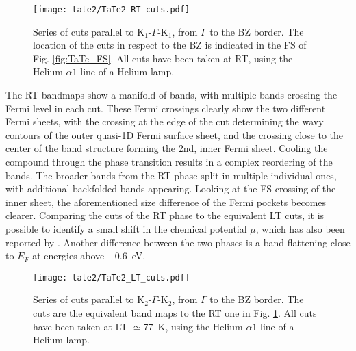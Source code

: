 \begin{figure}[t!]
	\centering
	\texttt{[image: tate2/TaTe2\_RT\_cuts.pdf]}
	\caption{Series of cuts parallel to K$_1$-$\Gamma$-K$_1$, from $\Gamma$ to the BZ border. The location of the cuts in respect to the BZ is indicated in the FS of Fig. \ref{fig:TaTe_FS}. All cuts have been taken at RT, using the Helium $\alpha1$ line of a Helium lamp.}
	\label{fig:TaTe_RT_cuts}
\end{figure}

The RT bandmaps show a manifold of bands, with multiple bands crossing the Fermi level in each cut.
These Fermi crossings clearly show the two different Fermi sheets, with the crossing at the edge of the cut determining the wavy contours of the outer quasi-1D Fermi surface sheet, and the crossing close to the center of the band structure forming the 2nd, inner Fermi sheet.
Cooling the compound through the phase transition results in a complex reordering of the bands.
The broader bands from the RT phase split in multiple individual ones, with additional backfolded bands appearing.
Looking at the FS crossing of the inner sheet, the aforementioned size difference of the Fermi pockets becomes clearer.
Comparing the cuts of the RT phase to the equivalent LT cuts, it is possible to identify a small shift in the chemical potential $\mu$, which has also been reported by \cite{mitsuishi_unveiling_2024}.
Another difference between the two phases is a band flattening close to $E_F$ at energies above \qty{-0.6}{\electronvolt}.

\begin{figure}[h]
	\centering
	\texttt{[image: tate2/TaTe2\_LT\_cuts.pdf]}
	\caption{Series of cuts parallel to K$_2$-$\Gamma$-K$_2$, from $\Gamma$ to the BZ border. The cuts are the equivalent band maps to the RT one in Fig. \ref{fig:TaTe_RT_cuts}. All cuts have been taken at LT $\simeq$\qty{77}{\kelvin}, using the Helium $\alpha1$ line of a Helium lamp.}
	\label{fig:TaTe_LT_cuts}
\end{figure}

